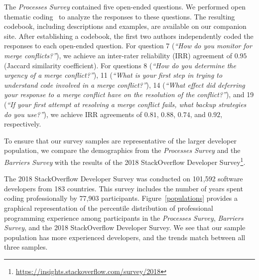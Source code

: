 The \textit{Processes Survey} contained five open-ended questions.
We performed open thematic coding~\cite{fereday2006demonstrating} to analyze the responses to these questions.
The resulting codebook, including descriptions and examples, are available on our companion site.
After establishing a codebook, the first two authors independently coded the responses to each open-ended question.
For question 7 (\textit{``How do you monitor for merge conflicts?''}), we achieve an inter-rater reliability (IRR) agreement of $0.95$ (Jaccard similarity coefficient).
For questions 8 (\textit{``How do you determine the urgency of a merge conflict?''}), 11 (\textit{``What is your first step in trying to understand code involved in a merge conflict?''}), 14 (\textit{``What effect did deferring your response to a merge conflict have on the resolution of the conflict?''}), and 19 (\textit{``If your first attempt at resolving a merge conflict fails, what backup strategies do you use?''}), we achieve IRR agreements of $0.81$, $0.88$, $0.74$, and $0.92$, respectively.

To ensure that our survey samples are representative of the larger developer population, we compare the demographics from the \textit{Processes Survey} and the \textit{Barriers Survey} with the results of the 2018 StackOverflow Developer Survey\footnote{\url{https://insights.stackoverflow.com/survey/2018}}.

The 2018 StackOverflow Developer Survey was conducted on 101,592 software developers from 183 countries.
This survey includes the number of years spent coding professionally by 77,903 participants.
Figure~\ref{populations} provides a graphical representation of the percentile distribution of professional programming experience among participants in the \textit{Processes Survey}, \textit{Barriers Survey}, and the 2018 StackOverflow Developer Survey.
We see that our sample population has more experienced developers, and the trends match between all three samples.

